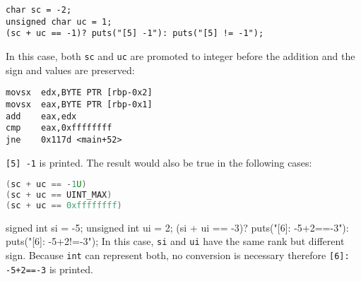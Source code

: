\begin{exmp} 
\begin{lstlisting}
char sc = -2;
unsigned char uc = 1;
(sc + uc == -1)? puts("[5] -1"): puts("[5] != -1");
\end{lstlisting}
In this case, both \texttt{sc} and \texttt{uc} are promoted to integer before the addition and the sign and values are preserved:
\begin{lstlisting}
movsx  edx,BYTE PTR [rbp-0x2]
movsx  eax,BYTE PTR [rbp-0x1]
add    eax,edx
cmp    eax,0xffffffff
jne    0x117d <main+52>
\end{lstlisting}
\texttt{[5] -1} is printed. The result would also be true in the following cases:
\begin{lstlisting}[language=c]
(sc + uc == -1U)
(sc + uc == UINT_MAX)
(sc + uc == 0xffffffff)
\end{lstlisting}
\qedblack
\end{exmp}

\begin{exmp}
signed int si = -5;
unsigned int ui = 2;
(si + ui == -3)? puts("[6]: -5+2==-3"): puts("[6]: -5+2!=-3");
In this case, \texttt{si} and \texttt{ui} have the same rank but different sign. Because \texttt{int} can represent both, no conversion is necessary therefore \texttt{[6]: -5+2==-3} is printed.
\qedblack
\end{exmp}

